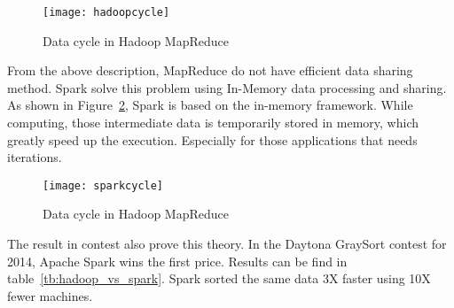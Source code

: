 \clearpage
\begin{figure}[h]
	\centering
	\texttt{[image: hadoopcycle]}
	\caption{Data cycle in Hadoop MapReduce}
	\label{fg:hadoop}
\end{figure}

From the above description, MapReduce do not have efficient data sharing method. Spark solve this problem using In-Memory data processing and sharing\cite{apache_spark}. As shown in Figure~\ref{fg:spark}, Spark is based on the in-memory framework. While computing, those intermediate data is temporarily stored in memory, which greatly speed up the execution. Especially for those applications that needs iterations.

\begin{figure}[h]
	\centering
	\texttt{[image: sparkcycle]}
	\caption{Data cycle in Hadoop MapReduce}
	\label{fg:spark}
\end{figure}

\clearpage
The result in contest also prove this theory. In the Daytona GraySort contest for 2014, Apache Spark wins the first price\cite{3_xin_2014}. Results can be find in table~\ref{tb:hadoop_vs_spark}. Spark sorted the same data 3X faster using 10X fewer machines.
\begin{table}[h]
	\centering
	\caption{Spark TeraSort vs MapReduce\cite{3_xin_2014}}
	\label{tb:hadoop_vs_spark}
\end{table}

